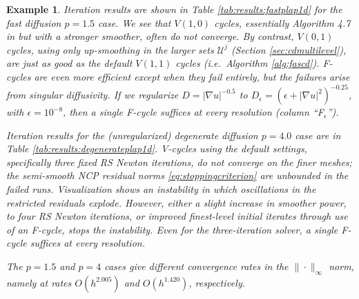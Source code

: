 \documentclass[letterpaper,final,12pt,reqno]{amsart}
\theoremstyle{cstyle}
\theoremstyle{cstyle*}
\theoremstyle{dstyle}
\newtheorem{example}[theorem]{Example}
\numberwithin{equation}{section}
\numberwithin{figure}{section}
\numberwithin{table}{section}
\numberwithin{theorem}{section}
\newcommand{\eps}{\epsilon}
\newcommand{\grad}{\nabla}
\begin{document}
\begin{example}
Iteration results are shown in Table \ref{tab:results:fastplap1d} for the fast diffusion $p=1.5$ case.  We see that $V(1,0)$ cycles, essentially Algorithm 4.7 in \cite{GraeserKornhuber2009} but with a stronger smoother, often do not converge.  By contrast, $V(0,1)$ cycles, using only up-smoothing in the larger sets $\mathcal{U}^j$ (Section \ref{sec:cdmultilevel}), are just as good as the default $V(1,1)$ cycles (i.e.~Algorithm \ref{alg:fascd}).  F-cycles are even more efficient except when they fail entirely, but the failures arise from singular diffusivity.  If we regularize  $D=|\grad u|^{-0.5}$ to $D_\eps = \left(\eps + |\grad u|^2\right)^{-0.25}$, with $\eps=10^{-8}$, then a single F-cycle suffices at every resolution (column ``F$_\eps$'').

Iteration results for the (unregularized) degenerate diffusion $p=4.0$ case are in Table \ref{tab:results:degenerateplap1d}.  V-cycles using the default settings, specifically three fixed RS Newton iterations, do not converge on the finer meshes; the semi-smooth NCP residual norms \eqref{eq:stoppingcriterion} are unbounded in the failed runs.  Visualization shows an instability in which oscillations in the restricted residuals explode.  However, either a slight increase in smoother power, to four RS Newton iterations, or improved finest-level initial iterates through use of an F-cycle, stops the instability.  Even for the three-iteration solver, a single F-cycle suffices at every resolution.

The $p=1.5$ and $p=4$ cases give different convergence rates in the $\|\cdot\|_\infty$ norm, namely at rates $O(h^{2.005})$ and $O(h^{1.420})$, respectively.
\end{example}
\end{document}
